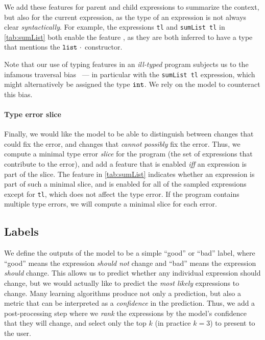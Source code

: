 We add these features for parent and child expressions to summarize the
context, but also for the current expression, as the type of an
expression is not always clear \emph{syntactically}.
%
For example, the expressions \lstinline!tl! and \lstinline!sumList tl!
in \autoref{tab:sumList} both enable the feature \HasTypeList, as they
are both inferred to have a type that mentions the $\mathtt{list}\ \cdot$
constructor.

Note that our use of typing features in an \emph{ill-typed} program
subjects us to the infamous traversal
bias~\cite{McAdam1998-ub,Yang2000-yr} --- in particular with the
\lstinline!sumList tl! expression, which might alternatively be assigned
the type $\mathtt{int}$.
%
We rely on the model to counteract this bias.

\paragraph{Type error slice}
Finally, we would like the model to be able to distinguish between
changes that could fix the error, and changes that
\emph{cannot possibly} fix the error.
%
Thus, we compute a minimal type error \emph{slice} for the program
(\ie the set of expressions that contribute to the error), and add a
feature that is enabled \emph{iff} an expression is part of the slice.
%
The \InSlice feature in \autoref{tab:sumList} indicates whether an
expression is part of such a minimal slice, and is enabled for all of
the sampled expressions except for \lstinline!tl!, which does not affect
the type error.
%
If the program contains multiple type errors, we will compute
a minimal slice for each error.

\subsection{Labels}
\label{sec:labels}
We define the outputs of the model to be a simple ``good'' or ``bad''
label, where ``good'' means the expression \emph{should not} change and
``bad'' means the expression \emph{should} change.
%
This allows us to predict whether any individual expression should
change, but we would actually like to predict the \emph{most likely}
expressions to change.
%
Many learning algorithms produce not only a prediction, but also a
metric that can be interpreted as a \emph{confidence} in the prediction.
%
Thus, we add a post-processing step where we \emph{rank} the expressions
by the model's confidence that they will change, and select only the top
$k$ (in practice $k=3$) to present to the user.

